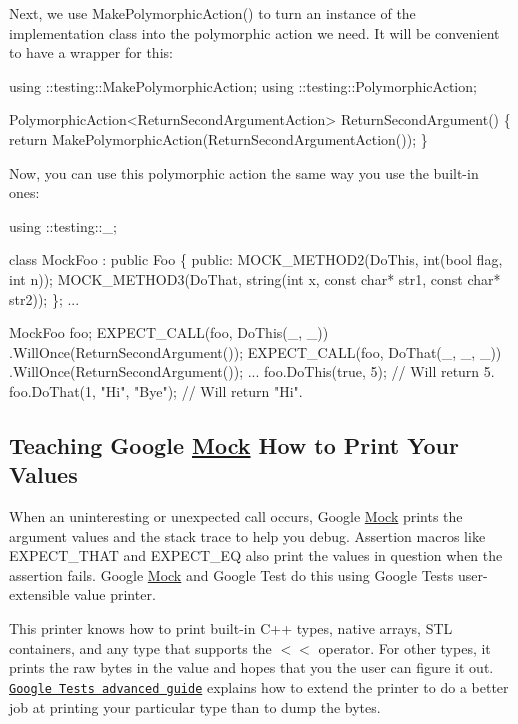 Next, we use {\ttfamily Make\+Polymorphic\+Action()} to turn an instance of the implementation class into the polymorphic action we need. It will be convenient to have a wrapper for this\+:


\begin{DoxyCode}
using ::testing::MakePolymorphicAction;
using ::testing::PolymorphicAction;

PolymorphicAction<ReturnSecondArgumentAction> ReturnSecondArgument() \{
  \textcolor{keywordflow}{return} MakePolymorphicAction(ReturnSecondArgumentAction());
\}
\end{DoxyCode}


Now, you can use this polymorphic action the same way you use the built-\/in ones\+:


\begin{DoxyCode}
using ::testing::\_;

\textcolor{keyword}{class }MockFoo : \textcolor{keyword}{public} Foo \{
 \textcolor{keyword}{public}:
  MOCK\_METHOD2(DoThis, \textcolor{keywordtype}{int}(\textcolor{keywordtype}{bool} flag, \textcolor{keywordtype}{int} n));
  MOCK\_METHOD3(DoThat, \textcolor{keywordtype}{string}(\textcolor{keywordtype}{int} x, \textcolor{keyword}{const} \textcolor{keywordtype}{char}* str1, \textcolor{keyword}{const} \textcolor{keywordtype}{char}* str2));
\};
...

  MockFoo foo;
  EXPECT\_CALL(foo, DoThis(\_, \_))
      .WillOnce(ReturnSecondArgument());
  EXPECT\_CALL(foo, DoThat(\_, \_, \_))
      .WillOnce(ReturnSecondArgument());
  ...
  foo.DoThis(\textcolor{keyword}{true}, 5);         \textcolor{comment}{// Will return 5.}
  foo.DoThat(1, \textcolor{stringliteral}{"Hi"}, \textcolor{stringliteral}{"Bye"});  \textcolor{comment}{// Will return "Hi".}
\end{DoxyCode}


\subsection*{Teaching Google \hyperlink{classMock}{Mock} How to Print Your Values}

When an uninteresting or unexpected call occurs, Google \hyperlink{classMock}{Mock} prints the argument values and the stack trace to help you debug. Assertion macros like {\ttfamily E\+X\+P\+E\+C\+T\+\_\+\+T\+H\+AT} and {\ttfamily E\+X\+P\+E\+C\+T\+\_\+\+EQ} also print the values in question when the assertion fails. Google \hyperlink{classMock}{Mock} and Google Test do this using Google Test\textquotesingle{}s user-\/extensible value printer.

This printer knows how to print built-\/in C++ types, native arrays, S\+TL containers, and any type that supports the {\ttfamily $<$$<$} operator. For other types, it prints the raw bytes in the value and hopes that you the user can figure it out. \href{../../googletest/docs/advanced.md#teaching-googletest-how-to-print-your-values}{\tt Google Test\textquotesingle{}s advanced guide} explains how to extend the printer to do a better job at printing your particular type than to dump the bytes. 